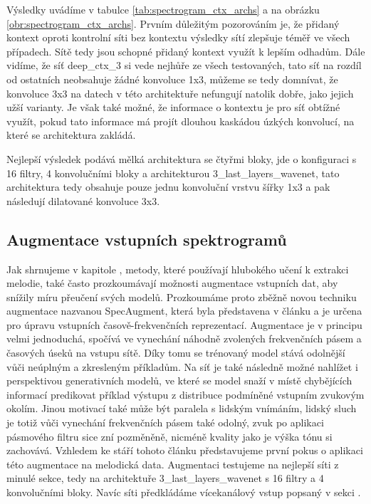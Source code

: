 Výsledky uvádíme v tabulce \ref{tab:spectrogram_ctx_archs} a na obrázku \ref{obr:spectrogram_ctx_archs}. Prvním důležitým pozorováním je, že přidaný kontext oproti kontrolní síti bez kontextu výsledky sítí zlepšuje téměř ve všech případech. Sítě tedy jsou schopné přidaný kontext využít k lepším odhadům. Dále vidíme, že síť deep\_ctx\_3 si vede nejhůře ze všech testovaných, tato síť na rozdíl od ostatních neobsahuje žádné konvoluce 1x3, můžeme se tedy domnívat, že konvoluce 3x3 na datech v této architektuře nefungují natolik dobře, jako jejich užší varianty. Je však také možné, že informace o kontextu je pro síť obtížné využít, pokud tato informace má projít dlouhou kaskádou úzkých konvolucí, na které se architektura zakládá.

Nejlepší výsledek podává mělká architektura se čtyřmi bloky, jde o konfiguraci s 16 filtry, 4 konvolučními bloky a architekturou 3\_last\_layers\_wavenet, tato architektura tedy obsahuje pouze jednu konvoluční vrstvu šířky 1x3 a pak následují dilatované konvoluce 3x3.

\subsection{Augmentace vstupních spektrogramů}

Jak shrnujeme v kapitole , metody, které používají hlubokého učení k extrakci melodie, také často prozkoumávají možnosti augmentace vstupních dat, aby snížily míru přeučení svých modelů. Prozkoumáme proto zběžně novou techniku augmentace nazvanou SpecAugment, která byla představena v článku \cite{Park2019} a je určena pro úpravu vstupních časově-frekvenčních reprezentací. Augmentace je v principu velmi jednoduchá, spočívá ve vynechání náhodně zvolených frekvenčních pásem a časových úseků na vstupu sítě. Díky tomu se trénovaný model stává odolnější vůči neúplným a zkresleným příkladům. Na síť je také následně možné nahlížet i perspektivou generativních modelů, ve které se model snaží v místě chybějících informací predikovat příklad výstupu z distribuce podmíněné vstupním zvukovým okolím. Jinou motivací také může být paralela s lidským vnímáním, lidský sluch je totiž vůči vynechání frekvenčních pásem také odolný, zvuk po aplikaci pásmového filtru sice zní pozměněně, nicméně kvality jako je výška tónu si zachovává. Vzhledem ke stáří tohoto článku představujeme první pokus o aplikaci této augmentace na melodická data. Augmentaci testujeme na nejlepší síti z minulé sekce, tedy na architektuře 3\_last\_layers\_wavenet s 16 filtry a 4 konvolučními bloky. Navíc síti předkládáme vícekanálový vstup popsaný v sekci .

